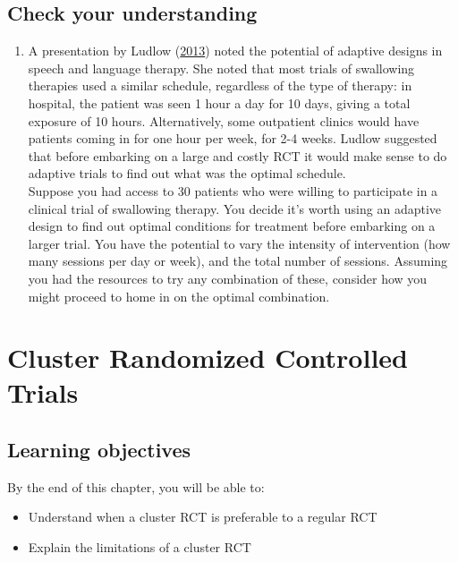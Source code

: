 \documentclass{krantz}
\providecommand{\tightlist}{%
\setlength{\itemsep}{0pt}\setlength{\parskip}{0pt}}
\begin{document}
\hypertarget{check-your-understanding-16}{%
\section{Check your understanding}\label{check-your-understanding-16}}

\begin{enumerate}
\def\labelenumi{\arabic{enumi}.}
\tightlist
\item
  A presentation by Ludlow (\protect\hyperlink{ref-ludlow2013}{2013}) noted the potential of adaptive designs in speech and language therapy. She noted that most trials of swallowing therapies used a similar schedule, regardless of the type of therapy: in hospital, the patient was seen 1 hour a day for 10 days, giving a total exposure of 10 hours. Alternatively, some outpatient clinics would have patients coming in for one hour per week, for 2-4 weeks. Ludlow suggested that before embarking on a large and costly RCT it would make sense to do adaptive trials to find out what was the optimal schedule.\\
  Suppose you had access to 30 patients who were willing to participate in a clinical trial of swallowing therapy. You decide it's worth using an adaptive design to find out optimal conditions for treatment before embarking on a larger trial. You have the potential to vary the intensity of intervention (how many sessions per day or week), and the total number of sessions. Assuming you had the resources to try any combination of these, consider how you might proceed to home in on the optimal combination.
\end{enumerate}

\hypertarget{cluster}{%
\chapter{Cluster Randomized Controlled Trials}\label{cluster}}

\hypertarget{learning-objectives-15}{%
\section{Learning objectives}\label{learning-objectives-15}}

By the end of this chapter, you will be able to:

\begin{itemize}
\item
  Understand when a cluster RCT is preferable to a regular RCT
\item
  Explain the limitations of a cluster RCT
\end{itemize}
\end{document}

